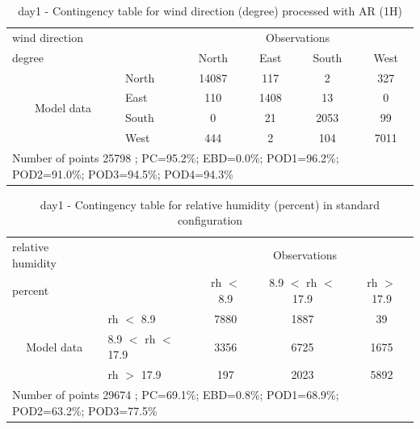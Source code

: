 \begin{table}[p!]
\begin{center}
\begin{tabular}{llcccc}
\hline
{wind direction}                                       &                                                    & \multicolumn{4}{c}{Observations}                 \\
{degree}                                       &                             & {North}   & {East} & {South} & {West} \\
\hline
\multicolumn{1}{c}{\multirow{4}{*}{Model data}}  & {North}              & 14087                & 117                       & 2              & 327\\
                                                 & {East}               & 110                & 1408                       & 13              & 0\\
                                                 & {South}              & 0                & 21                      & 2053             & 99\\
                                                 & {West}               & 444               & 2                      & 104             & 7011\\
\hline 
\multicolumn{6}{l}{ Number of points        25798 ; PC=95.2\%; EBD=0.0\%; POD1=96.2\%; POD2=91.0\%; POD3=94.5\%; POD4=94.3\%}                 \\
\end{tabular}
\end{center}
\caption{day1 - Contingency table for {wind direction} (degree) processed with AR (1H)}
\label{tab:contingencywdAFT:day1}
\end{table}
\begin{table}[p!]
\begin{center}
\begin{tabular}{llccc}
\hline
{relative humidity}                                       &                                                    & \multicolumn{3}{c}{Observations}                 \\
{percent}                                       &                             & rh $<$ 8.9   & 8.9 $<$ rh $<$ 17.9 & rh $>$ 17.9 \\
\hline
\multicolumn{1}{c}{\multirow{3}{*}{Model data}}  & rh $<$ 8.9             & 7880                & 1887                       & 39              \\
                                                 & 8.9  $<$ rh $<$ 17.9 & 3356                & 6725                       & 1675              \\
                                                 & rh $>$ 17.9             & 197                & 2023                       & 5892              \\
\hline
\multicolumn{5}{l}{ Number of points        29674 ; PC=69.1\%; EBD=0.8\%; POD1=68.9\%; POD2=63.2\%; POD3=77.5\%}
\end{tabular}
\end{center}
\caption{day1 - Contingency table for  relative humidity (percent) in standard configuration}
\label{tab:contingencyrhBEF:day1}
\end{table}
